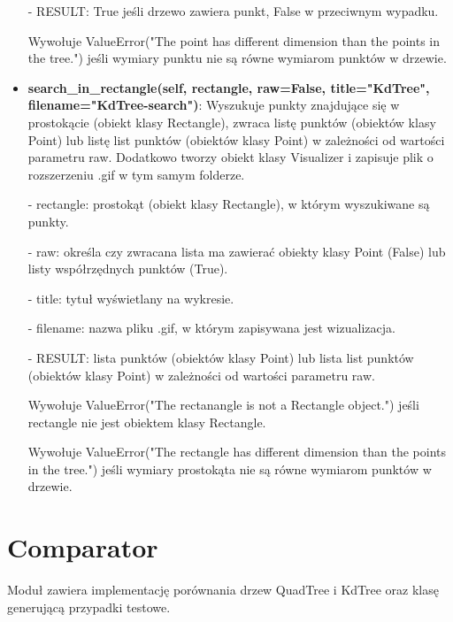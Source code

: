 \documentclass{lab}
\begin{document}
\begin{itemize}
  - RESULT: True jeśli drzewo zawiera punkt, False w przeciwnym wypadku.

  Wywołuje ValueError("The point has different dimension than the points in the tree.") jeśli wymiary punktu nie są równe wymiarom punktów w drzewie.

  \item \textbf{search\_in\_rectangle(self, rectangle, raw=False, title="KdTree", filename="KdTree-search")}:
  Wyszukuje punkty znajdujące się w prostokącie (obiekt klasy Rectangle), zwraca listę punktów (obiektów klasy Point) lub listę list punktów (obiektów klasy Point) w zależności od wartości parametru raw. Dodatkowo tworzy obiekt klasy Visualizer i zapisuje plik o rozszerzeniu .gif w tym samym folderze.

  - rectangle: prostokąt (obiekt klasy Rectangle), w którym wyszukiwane są punkty.

  - raw: określa czy zwracana lista ma zawierać obiekty klasy Point (False) lub listy współrzędnych punktów (True).

  - title: tytuł wyświetlany na wykresie.

  - filename: nazwa pliku .gif, w którym zapisywana jest wizualizacja.

  - RESULT: lista punktów (obiektów klasy Point) lub lista list punktów (obiektów klasy Point) w zależności od wartości parametru raw.

  Wywołuje ValueError("The rectanangle is not a Rectangle object.") jeśli rectangle nie jest obiektem klasy Rectangle.

  Wywołuje ValueError("The rectangle has different dimension than the points in the tree.") jeśli wymiary prostokąta nie są równe wymiarom punktów w drzewie.
\end{itemize}

\section{Comparator}
Moduł zawiera implementację porównania drzew QuadTree i KdTree oraz klasę generującą przypadki testowe.
\end{document}
